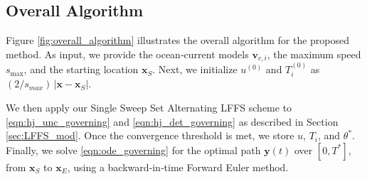 \documentclass[pdflatex,sn-mathphys-num]{sn-jnl}%
\def \bx{{\mathbf {x}}}
\def \by{{\mathbf {y}}}
\def \bv{{\mathbf {v}}}
\theoremstyle{thmstyleone}%
\theoremstyle{thmstyletwo}%
\theoremstyle{thmstylethree}%
\begin{document}
\subsection{Overall Algorithm }

Figure \ref{fig:overall_algorithm} illustrates the overall algorithm for the proposed method. As input, we provide the ocean‐current models \(
\bv_{c,i}\), the maximum speed \(s_{\max}\), and the starting location \(\bx_S\). Next, we initialize
$u^{(0)}$ and  $T_i^{(0)}$
as
$({2}/{s_{max}})\,\bigl\lvert \bx - \bx_S\bigr\rvert.$

We then apply our Single Sweep Set Alternating LFFS scheme to
\eqref{eqn:hj_unc_governing} and \eqref{eqn:hj_det_governing} as described in Section \ref{sec:LFFS_mod}. Once the convergence threshold is met, we store \(u\), \(T_i\), and \(\theta^*\). Finally, we solve
\eqref{eqn:ode_governing}
for the optimal path \(\by(t)\) over \([0,T^*]\), from \(\bx_S\) to \(\bx_E\), using a backward‐in‐time Forward Euler method.
\end{document}
